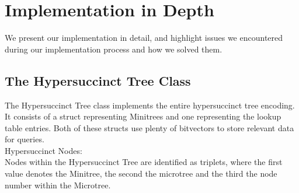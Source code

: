 \documentclass{article}
\begin{document}
\section{Implementation in Depth} \label{Implementation in Depth}
We present our implementation in detail, and highlight issues we encountered during our implementation process and how we solved them.\\
\subsection{The Hypersuccinct Tree Class} \label{The Hypersuccinct Tree Class}
The Hypersuccinct Tree class implements the entire hypersuccinct tree encoding. It consists of a struct representing Minitrees and one representing the lookup table entries.
Both of these structs use plenty of bitvectors to store relevant data for queries.\\

Hypersuccinct Nodes:\\
Nodes within the Hypersuccinct Tree are identified as triplets, where the first value denotes the Minitree, the second the microtree and the third the node number within the Microtree.\\
\end{document}
